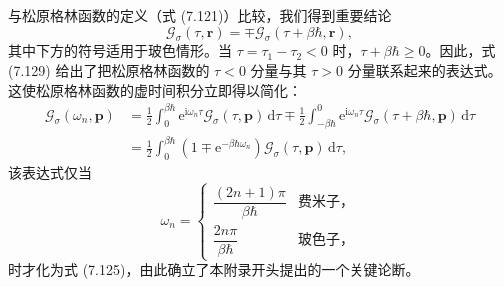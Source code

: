 与松原格林函数的定义（式 (7.121)）比较，我们得到重要结论
\begin{equation*}
\mathcal{G}_{\sigma}(\tau,\mathbf{r}) = \mp\mathcal{G}_{\sigma}(\tau + \beta\hbar,\mathbf{r}),
\tag{7.129}
\end{equation*}
其中下方的符号适用于玻色情形。当 $\tau = \tau_{1} - \tau_{2} < 0$ 时，$\tau + \beta\hbar \ge 0$。因此，式 (7.129) 给出了把松原格林函数的 $\tau < 0$ 分量与其 $\tau > 0$ 分量联系起来的表达式。这使松原格林函数的虚时间积分立即得以简化：
\begin{align*}
\mathcal{G}_{\sigma}(\omega_{n},\mathbf{p}) &= \frac{1}{2}\int_{0}^{\beta\hbar}\mathrm{e}^{\mathrm{i}\omega_{n}\tau}\mathcal{G}_{\sigma}(\tau,\mathbf{p})\,\mathrm{d}\tau \mp \frac{1}{2}\int_{-\beta\hbar}^{0}\mathrm{e}^{\mathrm{i}\omega_{n}\tau}\mathcal{G}_{\sigma}(\tau + \beta\hbar,\mathbf{p})\,\mathrm{d}\tau \\
&= \frac{1}{2}\int_{0}^{\beta\hbar}\left(1 \mp \mathrm{e}^{-\beta\hbar\omega_{n}}\right)\mathcal{G}_{\sigma}(\tau,\mathbf{p})\,\mathrm{d}\tau,
\tag{7.130}
\end{align*}
该表达式仅当
\begin{equation*}
\omega_{n} =
\begin{cases}
\dfrac{(2n+1)\pi}{\beta\hbar} & \text{费米子}，\\[2ex]
\dfrac{2n\pi}{\beta\hbar} & \text{玻色子}，
\end{cases}
\end{equation*}
时才化为式 (7.125)，由此确立了本附录开头提出的一个关键论断。

